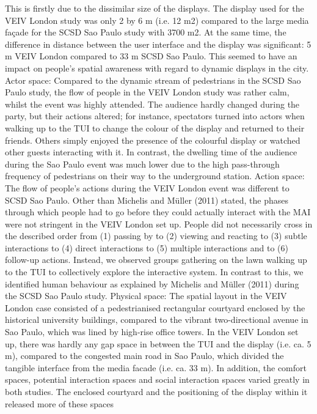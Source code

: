 This is firstly due to the dissimilar size of the displays. The display used for the
VEIV London study was only 2 by 6 m (i.e. 12 m2) compared to the large media
façade for the SCSD Sao Paulo study with 3700 m2. At the same time, the difference
in distance between the user interface and the display was significant: 5 m
VEIV London compared to 33 m SCSD Sao Paulo. This seemed to have an impact
on people’s spatial awareness with regard to dynamic displays in the city.
Actor space: Compared to the dynamic stream of pedestrians in the SCSD Sao
Paulo study, the flow of people in the VEIV London study was rather calm, whilst
the event was highly attended. The audience hardly changed during the party, but
their actions altered; for instance, spectators turned into actors when walking up
to the TUI to change the colour of the display and returned to their friends. Others
simply enjoyed the presence of the colourful display or watched other guests interacting
with it. In contrast, the dwelling time of the audience during the Sao Paulo
event was much lower due to the high pass-through frequency of pedestrians on
their way to the underground station.
Action space: The flow of people’s actions during the VEIV London event was different
to SCSD Sao Paulo. Other than Michelis and Müller (2011) stated, the phases
through which people had to go before they could actually interact with the MAI
were not stringent in the VEIV London set up. People did not necessarily cross in the described order from (1) passing by to (2) viewing and reacting to (3) subtle interactions
to (4) direct interactions to (5) multiple interactions and to (6) follow-up actions.
Instead, we observed groups gathering on the lawn walking up to the TUI to collectively
explore the interactive system. In contrast to this, we identified human behaviour
as explained by Michelis and Müller (2011) during the SCSD Sao Paulo study.
Physical space: The spatial layout in the VEIV London case consisted of a
pedestrianised rectangular courtyard enclosed by the historical university buildings,
compared to the vibrant two-directional avenue in Sao Paulo, which was
lined by high-rise office towers. In the VEIV London set up, there was hardly
any gap space in between the TUI and the display (i.e. ca. 5 m), compared to the
congested main road in Sao Paulo, which divided the tangible interface from the
media facade (i.e. ca. 33 m). In addition, the comfort spaces, potential interaction
spaces and social interaction spaces varied greatly in both studies. The enclosed
courtyard and the positioning of the display within it released more of these spaces
